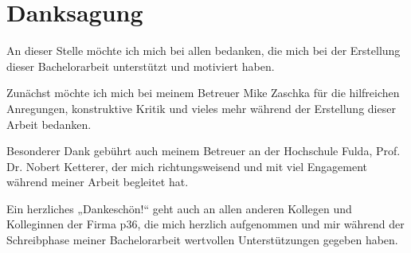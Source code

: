 
\chapter*{Danksagung}

An dieser Stelle möchte ich mich bei allen bedanken, die mich bei der Erstellung dieser Bachelorarbeit unterstützt und motiviert haben.

Zunächst möchte ich mich bei meinem Betreuer Mike Zaschka für die hilfreichen Anregungen, konstruktive Kritik und vieles mehr während der Erstellung dieser Arbeit bedanken. 

Besonderer Dank gebührt auch meinem Betreuer an der Hochschule Fulda, Prof. Dr. Nobert Ketterer, der mich richtungsweisend und mit viel Engagement während meiner Arbeit begleitet hat.

Ein herzliches „Dankeschön!“ geht auch an allen anderen Kollegen und Kolleginnen der Firma p36, die mich herzlich aufgenommen und mir während der Schreibphase meiner Bachelorarbeit wertvollen Unterstützungen gegeben haben.



